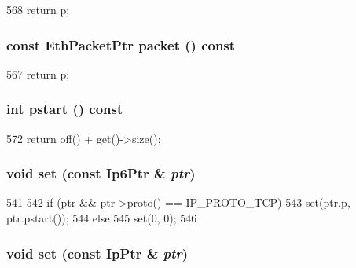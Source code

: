 \begin{DoxyCode}
568 { return p; }
\end{DoxyCode}
\hypertarget{classNet_1_1TcpPtr_a13e32a6fa7b2f1b41d1d8dc32d8fda9e}{
\subsubsection[{packet}]{\setlength{\rightskip}{0pt plus 5cm}const {\bf EthPacketPtr} packet () const}}
\label{classNet_1_1TcpPtr_a13e32a6fa7b2f1b41d1d8dc32d8fda9e}



\begin{DoxyCode}
567 { return p; }
\end{DoxyCode}
\hypertarget{classNet_1_1TcpPtr_ae6fc8073bc02ff3fd03030e0936d56eb}{
\subsubsection[{pstart}]{\setlength{\rightskip}{0pt plus 5cm}int pstart () const}}
\label{classNet_1_1TcpPtr_ae6fc8073bc02ff3fd03030e0936d56eb}



\begin{DoxyCode}
572 { return off() + get()->size(); }
\end{DoxyCode}
\hypertarget{classNet_1_1TcpPtr_aff41448998f095ea26efa08f89bb1c7d}{
\subsubsection[{set}]{\setlength{\rightskip}{0pt plus 5cm}void set (const {\bf Ip6Ptr} \& {\em ptr})}}
\label{classNet_1_1TcpPtr_aff41448998f095ea26efa08f89bb1c7d}



\begin{DoxyCode}
541     {
542         if (ptr && ptr->proto() == IP_PROTO_TCP)
543             set(ptr.p, ptr.pstart());
544         else
545             set(0, 0);
546     }
\end{DoxyCode}
\hypertarget{classNet_1_1TcpPtr_a0a0778623a259833ee4dc0317212ffec}{
\subsubsection[{set}]{\setlength{\rightskip}{0pt plus 5cm}void set (const {\bf IpPtr} \& {\em ptr})}}
\label{classNet_1_1TcpPtr_a0a0778623a259833ee4dc0317212ffec}



